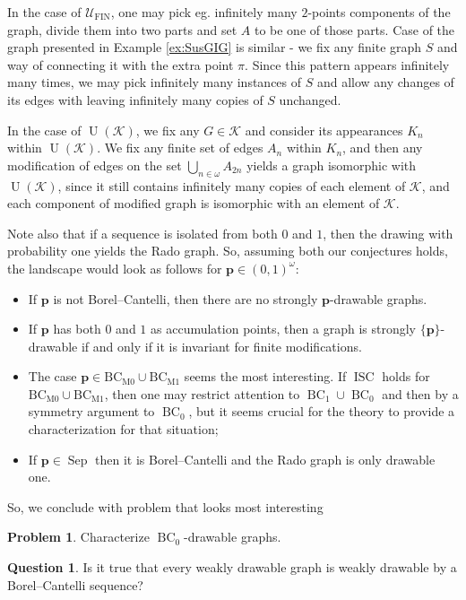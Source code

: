 \documentclass{amsart}
\theoremstyle{plain}
\theoremstyle{definition}
\newtheorem{que}[theorem]{Question}
\newtheorem{prob}[theorem]{Problem}
\theoremstyle{remark}
\numberwithin{equation}{section}
\newcommand{\mc}{\mathcal}
\newcommand{\on}{\operatorname}
\newcommand{\CIT}{\operatorname{ISC}}
\newcommand{\UU}{\mathcal{U}}
\DeclareMathOperator{\UN}{U}
\DeclareMathOperator{\fin}{FIN}
\DeclareMathOperator{\bc}{BC}
\begin{document}
In the case of $\UU_{\fin}$, one may pick eg. infinitely many $2$-points components of the graph, divide them into two parts and set $A$ to be one of those parts. Case of the graph presented in Example \ref{ex:SusGIG} is similar - we fix any finite graph $S$ and way of connecting it with the extra point $\pi$. Since this pattern appears infinitely many times, we may pick infinitely many instances of $S$ and allow any changes of its edges with leaving infinitely many copies of $S$ unchanged. 

In the case of $\UN(\mc{K})$, we fix any $G \in \mc{K}$ and consider its appearances $K_n$ within $\UN(\mc{K})$. We fix any finite set of edges $A_n$ within $K_n$, and then any modification of edges on the set $\bigcup\limits_{n\in\omega} A_{2n}$ yields a graph isomorphic with $\UN(\mc{K})$, since it still contains infinitely many copies of each element of $\mc{K}$, and each component of modified graph is isomorphic with an element of $\mc{K}$.

Note also that if a sequence is isolated from both $0$ and $1$, then the drawing with probability one yields the Rado graph. So, assuming both our conjectures holds, the landscape would look as follows for $\textbf{p}\in(0,1)^\omega$:
\begin{itemize}
    \item If $\textbf{p}$ is not Borel--Cantelli, then there are no strongly $\textbf{p}$-drawable graphs.
    \item If $\textbf{p}$ has both $0$ and $1$ as accumulation points, then a graph is strongly $\{\textbf{p}\}$-drawable if and only if it is invariant for finite modifications.
    \item The case $\textbf{p}\in \on{BC_{M0}}\cup\on{BC_{M1}}$ seems the most interesting. If $\CIT$ holds for $\on{BC_{M0}}\cup\on{BC_{M1}}$, then one may restrict attention to $\bc_1\cup \bc_0$ and then by a symmetry argument to $\bc_0$, but it seems crucial for the theory to provide a characterization for that situation;
    \item If $\textbf{p}\in\on{Sep}$ then it is Borel--Cantelli and the Rado graph is only drawable one. 
\end{itemize}
So, we conclude with problem that looks most interesting
\begin{prob}
    Characterize $\bc_0$-drawable graphs.
\end{prob}

\begin{que}
    Is it true that every weakly drawable graph is weakly drawable by a Borel--Cantelli sequence?
\end{que}
\end{document}
